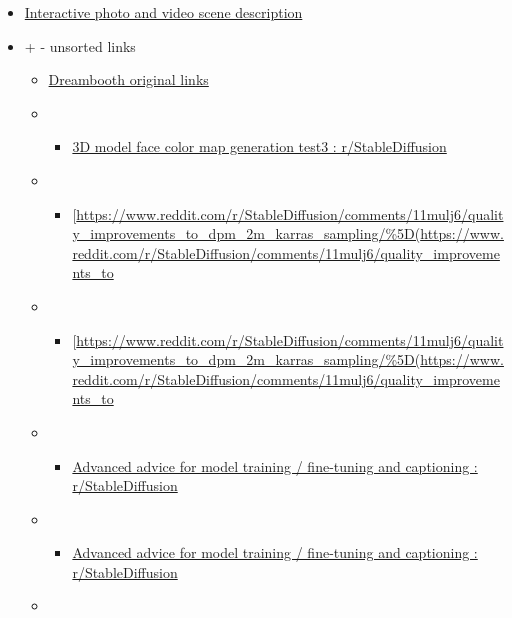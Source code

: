 \begin{itemize}
\item
  \href{https://github.com/Vision-CAIR/ChatCaptioner}{Interactive photo
  and video scene description}
\item
  \protect\hypertarget{show1_1}{}{+} \protect\hypertarget{hide1_1}{}{-}
  unsorted links
  \begin{itemize}
  \item
    \href{https://github.com/huggingface/diffusers/blob/main/examples/dreambooth/train_dreambooth.py)\%20script...}{Dreambooth
    original links}
  \item
    \begin{itemize}   
    \item
      \href{https://www.reddit.com/r/StableDiffusion/comments/11ol47u/3d_model_face_color_map_generation_test3/}{3D
      model face color map generation test3 : r/StableDiffusion}
    \end{itemize}
  \item
    \begin{itemize}
     
    \item
      {[}\url{https://www.reddit.com/r/StableDiffusion/comments/11mulj6/quality_improvements_to_dpm_2m_karras_sampling/\%5D(}\url{https://www.reddit.com/r/StableDiffusion/comments/11mulj6/quality_improvements_to}
    \end{itemize}
  \item
    \begin{itemize}
     
    \item
      {[}\url{https://www.reddit.com/r/StableDiffusion/comments/11mulj6/quality_improvements_to_dpm_2m_karras_sampling/\%5D(}\url{https://www.reddit.com/r/StableDiffusion/comments/11mulj6/quality_improvements_to}
    \end{itemize}
  \item
    \begin{itemize}
     
    \item
      \href{https://www.reddit.com/r/StableDiffusion/comments/114dxgl/advanced_advice_for_model_training_finetuning_and/}{Advanced
      advice for model training / fine-tuning and captioning :
      r/StableDiffusion}
    \end{itemize}
  \item
    \begin{itemize}
     
    \item
      \href{https://www.reddit.com/r/StableDiffusion/comments/114dxgl/advanced_advice_for_model_training_finetuning_and/}{Advanced
      advice for model training / fine-tuning and captioning :
      r/StableDiffusion}
    \end{itemize}
  \item
    \begin{itemize}
     

\end{itemize}
\end{itemize}
\end{itemize}
